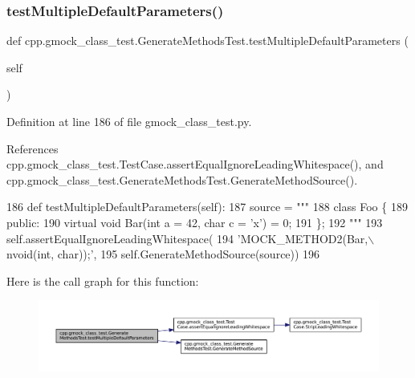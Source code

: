 \subsubsection{\texorpdfstring{test\+Multiple\+Default\+Parameters()}{testMultipleDefaultParameters()}}
{\footnotesize\ttfamily def cpp.\+gmock\+\_\+class\+\_\+test.\+Generate\+Methods\+Test.\+test\+Multiple\+Default\+Parameters (\begin{DoxyParamCaption}\item[{}]{self }\end{DoxyParamCaption})}



Definition at line 186 of file gmock\+\_\+class\+\_\+test.\+py.



References cpp.\+gmock\+\_\+class\+\_\+test.\+Test\+Case.\+assert\+Equal\+Ignore\+Leading\+Whitespace(), and cpp.\+gmock\+\_\+class\+\_\+test.\+Generate\+Methods\+Test.\+Generate\+Method\+Source().


\begin{DoxyCode}
186   \textcolor{keyword}{def }testMultipleDefaultParameters(self):
187     source = \textcolor{stringliteral}{"""}
188 \textcolor{stringliteral}{class Foo \{}
189 \textcolor{stringliteral}{ public:}
190 \textcolor{stringliteral}{  virtual void Bar(int a = 42, char c = 'x') = 0;}
191 \textcolor{stringliteral}{\};}
192 \textcolor{stringliteral}{"""}
193     self.assertEqualIgnoreLeadingWhitespace(
194         \textcolor{stringliteral}{'MOCK\_METHOD2(Bar,\(\backslash\)nvoid(int, char));'},
195         self.GenerateMethodSource(source))
196 
\end{DoxyCode}
Here is the call graph for this function\+:
\nopagebreak
\begin{figure}[H]
\begin{center}
\leavevmode
\includegraphics[width=350pt]{classcpp_1_1gmock__class__test_1_1GenerateMethodsTest_a41b91cc39a55385b8c4b97d804e80345_cgraph}
\end{center}
\end{figure}
\mbox{\label{classcpp_1_1gmock__class__test_1_1GenerateMethodsTest_a6a2118fde4c59d2f8f402652e7aa8896}} 
